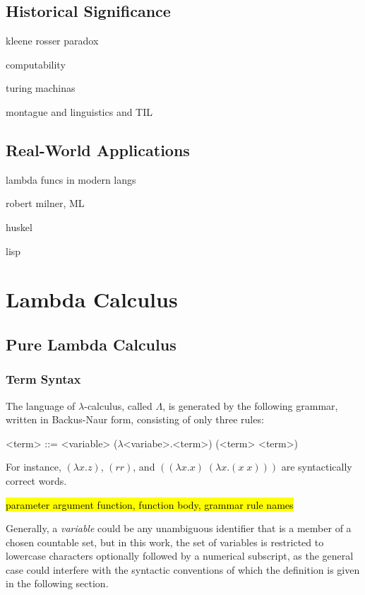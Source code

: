 \documentclass[a4paper,10pt]{article}
\begin{document}
\subsection{Historical Significance}
kleene rosser paradox

computability

turing machinas

montague and linguistics and TIL

\subsection{Real-World Applications}

lambda funcs in modern langs

robert milner, ML

huskel

lisp

\section{Lambda Calculus}

\subsection{Pure Lambda Calculus}

\subsubsection{Term Syntax}
The language of $\lambda$-calculus, called $\Lambda$, is generated by the following
grammar, written in Backus-Naur form, consisting of only three rules:
\setlength{\grammarindent}{5.2em}
\begin{grammar}
<term> ::= <variable> 
\alt ($\lambda$<variabe>.<term>) 
\alt (<term> <term>) 
\end{grammar}
For instance, $(\lambda x.z)$, $(rr)$, and $((\lambda x.x)\;(\lambda x.(x\;x)))$ are syntactically correct words.

\hl{parameter argument function, function body, grammar rule names }

Generally, a \textit{variable} could be any unambiguous identifier 
that is a member of a chosen countable set, but in this work, the set
of variables is restricted to
lowercase characters optionally followed by a numerical subscript,
as the general case could interfere with the syntactic conventions
of which the definition is given in the following section.
\end{document}
